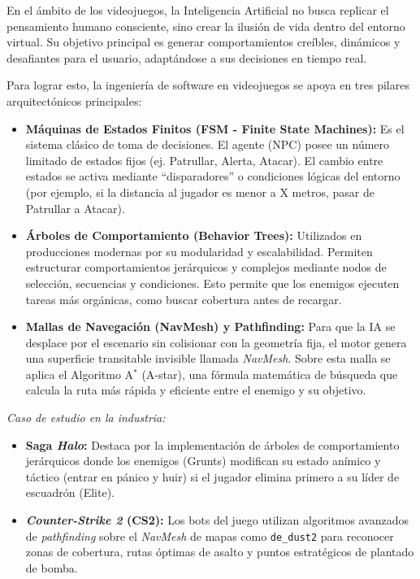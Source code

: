 \documentclass[12pt]{report}
\begin{document}
En el ámbito de los videojuegos, la Inteligencia Artificial no busca replicar el pensamiento humano consciente, sino crear la ilusión de vida dentro del entorno virtual. Su objetivo principal es generar comportamientos creíbles, dinámicos y desafiantes para el usuario, adaptándose a sus decisiones en tiempo real.

Para lograr esto, la ingeniería de software en videojuegos se apoya en tres pilares arquitectónicos principales:

\begin{itemize}
    \item \textbf{Máquinas de Estados Finitos (FSM - Finite State Machines):} Es el sistema clásico de toma de decisiones. El agente (NPC) posee un número limitado de estados fijos (ej. Patrullar, Alerta, Atacar). El cambio entre estados se activa mediante ``disparadores'' o condiciones lógicas del entorno (por ejemplo, si la distancia al jugador es menor a X metros, pasar de Patrullar a Atacar).
    \item \textbf{Árboles de Comportamiento (Behavior Trees):} Utilizados en producciones modernas por su modularidad y escalabilidad. Permiten estructurar comportamientos jerárquicos y complejos mediante nodos de selección, secuencias y condiciones. Esto permite que los enemigos ejecuten tareas más orgánicas, como buscar cobertura antes de recargar.
    \item \textbf{Mallas de Navegación (NavMesh) y Pathfinding:} Para que la IA se desplace por el escenario sin colisionar con la geometría fija, el motor genera una superficie transitable invisible llamada \textit{NavMesh}. Sobre esta malla se aplica el Algoritmo A$^*$ (A-star), una fórmula matemática de búsqueda que calcula la ruta más rápida y eficiente entre el enemigo y su objetivo.
\end{itemize}

\textit{Caso de estudio en la industria:}
\begin{itemize}
    \item \textbf{Saga \textit{Halo}:} Destaca por la implementación de árboles de comportamiento jerárquicos donde los enemigos (Grunts) modifican su estado anímico y táctico (entrar en pánico y huir) si el jugador elimina primero a su líder de escuadrón (Elite).
    \item \textbf{\textit{Counter-Strike 2} (CS2):} Los bots del juego utilizan algoritmos avanzados de \textit{pathfinding} sobre el \textit{NavMesh} de mapas como \texttt{de\_dust2} para reconocer zonas de cobertura, rutas óptimas de asalto y puntos estratégicos de plantado de bomba.
\end{itemize}
\end{document}
